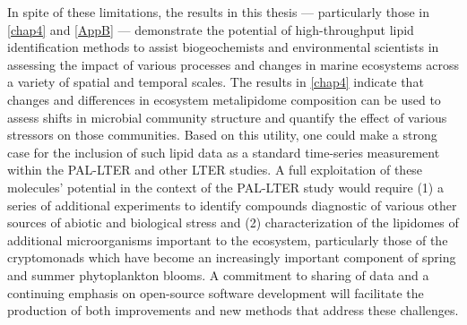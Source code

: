 In spite of these limitations, the results in this thesis --- particularly those in \autoref{chap4} and \autoref{AppB} --- demonstrate the potential of high-throughput lipid identification methods to assist biogeochemists and environmental scientists in assessing the impact of various processes and changes in marine ecosystems across a variety of spatial and temporal scales. The results in \autoref{chap4} indicate that changes and differences in ecosystem metalipidome composition can be used to assess shifts in microbial community structure and quantify the effect of various stressors on those communities. Based on this utility, one could make a strong case for the inclusion of such lipid data as a standard time-series measurement within the PAL-LTER and other LTER studies. A full exploitation of these molecules' potential in the context of the PAL-LTER study would require (1) a series of additional experiments to identify compounds diagnostic of various other sources of abiotic and biological stress and (2) characterization of the lipidomes of additional microorganisms important to the ecosystem, particularly those of the cryptomonads which have become an increasingly important component of spring and summer phytoplankton blooms. A commitment to sharing of data and a continuing emphasis on open-source software development will facilitate the production of both improvements and new methods that address these challenges.

